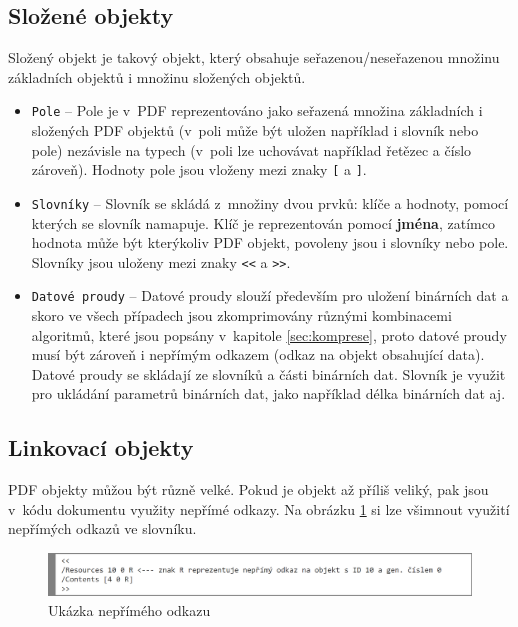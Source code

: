 \subsection{Složené objekty}	
Složený objekt je takový objekt, který obsahuje seřazenou/neseřazenou množinu základních objektů i množinu složených objektů.
	\begin{itemize}
		\item \verb|Pole| -- Pole je v~PDF reprezentováno jako seřazená množina základních i složených PDF objektů (v~poli může být uložen například i slovník nebo pole) nezávisle na typech (v~poli lze uchovávat například řetězec a číslo zároveň). Hodnoty pole jsou vloženy mezi znaky \verb|[| a \verb|]|.
		\item \verb|Slovníky| -- Slovník se skládá z~množiny dvou prvků: klíče a hodnoty, pomocí kterých se slovník namapuje. Klíč je reprezentován pomocí \textbf{jména}, zatímco hodnota může být kterýkoliv PDF objekt, povoleny jsou i slovníky nebo pole. Slovníky jsou uloženy mezi znaky \verb|<<| a \verb|>>|.
		\item \verb|Datové proudy| -- Datové proudy slouží především pro uložení binárních dat a skoro ve všech případech jsou zkomprimovány různými kombinacemi algoritmů, které jsou popsány v~kapitole \ref{sec:komprese}, proto datové proudy musí být zároveň i nepřímým odkazem (odkaz na objekt obsahující data). Datové proudy se skládají ze slovníků a části binárních dat. Slovník je využit pro ukládání parametrů binárních dat, jako například délka binárních dat aj.
	\end{itemize}
\subsection{Linkovací objekty}
PDF objekty můžou být různě velké. Pokud je objekt až příliš veliký, pak jsou v~kódu dokumentu využity nepřímé odkazy. Na obrázku \ref{fig:indirect_reference} si lze všimnout využití nepřímých odkazů ve slovníku. 
	\begin{figure}[h!]
	\centering
	\includegraphics[width=15cm]{img/pdf_indirect_reference}
	\caption{Ukázka nepřímého odkazu}
	\label{fig:indirect_reference}
	\end{figure}


